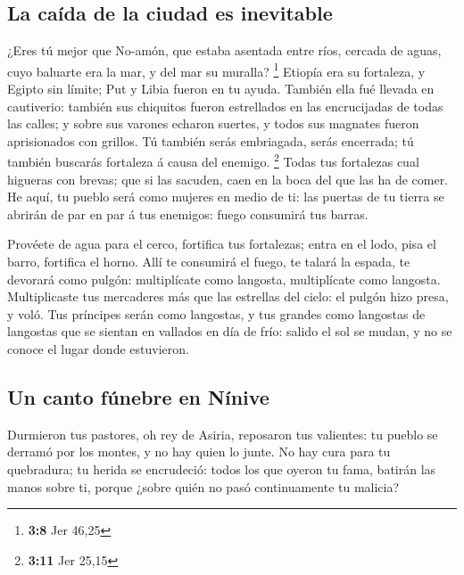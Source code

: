 \hypertarget{la-cauxedda-de-la-ciudad-es-inevitable}{%
\subsection{La caída de la ciudad es
inevitable}\label{la-cauxedda-de-la-ciudad-es-inevitable}}

 ¿Eres tú mejor que No-amón, que estaba asentada entre ríos,
cercada de aguas, cuyo baluarte era la mar, y del mar su muralla?
\footnote{\textbf{3:8} Jer 46,25}  Etiopía era su fortaleza,
y Egipto sin límite; Put y Libia fueron en tu ayuda. 
También ella fué llevada en cautiverio: también sus chiquitos fueron
estrellados en las encrucijadas de todas las calles; y sobre sus varones
echaron suertes, y todos sus magnates fueron aprisionados con grillos.
 Tú también serás embriagada, serás encerrada; tú también
buscarás fortaleza á causa del enemigo. \footnote{\textbf{3:11} Jer
  25,15}  Todas tus fortalezas cual higueras con brevas;
que si las sacuden, caen en la boca del que las ha de comer.
 He aquí, tu pueblo será como mujeres en medio de ti: las
puertas de tu tierra se abrirán de par en par á tus enemigos: fuego
consumirá tus barras.

 Provéete de agua para el cerco, fortifica tus fortalezas;
entra en el lodo, pisa el barro, fortifica el horno.  Allí
te consumirá el fuego, te talará la espada, te devorará como pulgón:
multiplícate como langosta, multiplícate como langosta. 
Multiplicaste tus mercaderes más que las estrellas del cielo: el pulgón
hizo presa, y voló.  Tus príncipes serán como langostas, y
tus grandes como langostas de langostas que se sientan en vallados en
día de frío: salido el sol se mudan, y no se conoce el lugar donde
estuvieron.

\hypertarget{un-canto-fuxfanebre-en-nuxednive}{%
\subsection{Un canto fúnebre en
Nínive}\label{un-canto-fuxfanebre-en-nuxednive}}

 Durmieron tus pastores, oh rey de Asiria, reposaron tus
valientes: tu pueblo se derramó por los montes, y no hay quien lo junte.
 No hay cura para tu quebradura; tu herida se encrudeció:
todos los que oyeron tu fama, batirán las manos sobre ti, porque ¿sobre
quién no pasó continuamente tu malicia?
